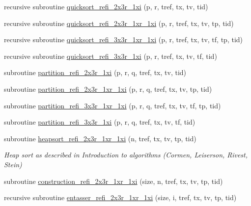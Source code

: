 \begin{DoxyCompactItemize}
\item 
recursive subroutine \hyperlink{namespacemodsortinterf_a083e6e7591f58e1473c8d0027dec8811}{quicksort\+\_\+refi\+\_\+2x3r\+\_\+1xi} (p, r, tref, tx, tv, tid)
\item 
recursive subroutine \hyperlink{namespacemodsortinterf_a4a0d6eb151ffef0f10e55f3b4f6bbd4c}{quicksort\+\_\+refi\+\_\+2x3r\+\_\+1xr\+\_\+1xi} (p, r, tref, tx, tv, tp, tid)
\item 
recursive subroutine \hyperlink{namespacemodsortinterf_a84b8a8187e575b463e701c9660e060ed}{quicksort\+\_\+refi\+\_\+3x3r\+\_\+1xr\+\_\+1xi} (p, r, tref, tx, tv, tf, tp, tid)
\item 
recursive subroutine \hyperlink{namespacemodsortinterf_a4e2275566fd82541954638bda4797d5b}{quicksort\+\_\+refi\+\_\+3x3r\+\_\+1xi} (p, r, tref, tx, tv, tf, tid)
\item 
subroutine \hyperlink{namespacemodsortinterf_aa3bf097c9f86c18f8d7b4584b966c4b3}{partition\+\_\+refi\+\_\+2x3r\+\_\+1xi} (p, r, q, tref, tx, tv, tid)
\item 
subroutine \hyperlink{namespacemodsortinterf_afb245c76ff89ec76fd050a43eabcecd9}{partition\+\_\+refi\+\_\+2x3r\+\_\+1xr\+\_\+1xi} (p, r, q, tref, tx, tv, tp, tid)
\item 
subroutine \hyperlink{namespacemodsortinterf_a1cc99117f29237a3a9a368981a8ccd67}{partition\+\_\+refi\+\_\+3x3r\+\_\+1xr\+\_\+1xi} (p, r, q, tref, tx, tv, tf, tp, tid)
\item 
subroutine \hyperlink{namespacemodsortinterf_ac2c52347c0eec87e2c2e6df84257a6d9}{partition\+\_\+refi\+\_\+3x3r\+\_\+1xi} (p, r, q, tref, tx, tv, tf, tid)
\item 
subroutine \hyperlink{namespacemodsortinterf_ada0c844a63cc8db123d38c60d4d1fb9b}{heapsort\+\_\+refi\+\_\+2x3r\+\_\+1xr\+\_\+1xi} (n, tref, tx, tv, tp, tid)
\begin{DoxyCompactList}\small\item\em Heap sort as described in Introduction to algorithms (Cormen, Leiserson, Rivest, Stein) \end{DoxyCompactList}\item 
subroutine \hyperlink{namespacemodsortinterf_a4f6ae4d8da475aa6c30f51216d5b49f7}{construction\+\_\+refi\+\_\+2x3r\+\_\+1xr\+\_\+1xi} (size, n, tref, tx, tv, tp, tid)
\item 
recursive subroutine \hyperlink{namespacemodsortinterf_a67991c6305dfcc00beccf5b59b56a27a}{entasser\+\_\+refi\+\_\+2x3r\+\_\+1xr\+\_\+1xi} (size, i, tref, tx, tv, tp, tid)

\end{DoxyCompactItemize}

